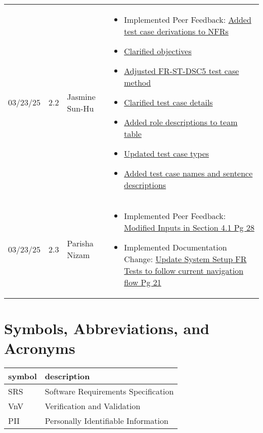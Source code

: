 \documentclass[12pt, titlepage]{article}
\begin{document}
\begin{longtable}{p{2cm}p{1cm}p{4cm}p{8cm}}
03/23/25 & 2.2 & Jasmine Sun-Hu &
\begin{itemize}[noitemsep, topsep=0pt]
  \item Implemented Peer Feedback: \href{https://github.com/parishanizam/TeleHealth/issues/224}{Added test case derivations to NFRs}
  \item \href{https://github.com/parishanizam/TeleHealth/issues/223}{Clarified objectives}
  \item \href{https://github.com/parishanizam/TeleHealth/issues/222}{Adjusted FR-ST-DSC5 test case method}
  \item \href{https://github.com/parishanizam/TeleHealth/issues/221}{Clarified test case details}
  \item \href{https://github.com/parishanizam/TeleHealth/issues/206}{Added role descriptions to team table}
  \item \href{https://github.com/parishanizam/TeleHealth/issues/205}{Updated test case types}
  \item \href{https://github.com/parishanizam/TeleHealth/issues/204}{Added test case names and sentence descriptions}
\end{itemize} \\

03/23/25 & 2.3 & Parisha Nizam &
\begin{itemize}[noitemsep, topsep=0pt]
  \item Implemented Peer Feedback: \href{https://github.com/parishanizam/TeleHealth/issues/534}{Modified Inputs in Section 4.1 Pg 28}
  \item Implemented Documentation Change: \href{https://github.com/parishanizam/TeleHealth/issues/496}{Update System Setup FR Tests to follow current navigation flow Pg 21}
\end{itemize} \\

\bottomrule
\end{longtable}

\newpage

\tableofcontents

\listoftables

\newpage

\section{Symbols, Abbreviations, and Acronyms}

\renewcommand{\arraystretch}{1.2}
\begin{tabular}{l l} 
  \toprule		
  \textbf{symbol} & \textbf{description}\\
  \midrule 
  SRS & Software Requirements Specification\\
  VnV & Verification and Validation\\
  PII & Personally Identifiable Information\\
  \bottomrule
\end{tabular}\\
\end{document}
